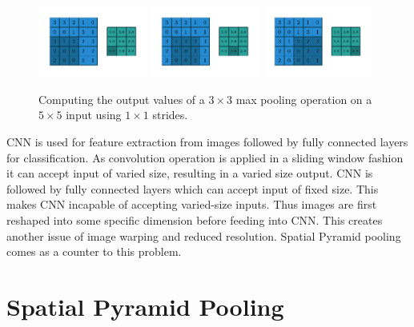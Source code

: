 \begin{figure}
    \includegraphics[width=0.32\textwidth]{pdf/numerical_max_pooling_06.pdf}
    \includegraphics[width=0.32\textwidth]{pdf/numerical_max_pooling_07.pdf}
    \includegraphics[width=0.32\textwidth]{pdf/numerical_max_pooling_08.pdf}
    \caption{\label{fig:numerical_max_pooling} Computing the output values of a
        $3 \times 3$ max pooling operation on a $5 \times 5$ input using $1
        \times 1$ strides.}
\end{figure}

CNN is used for feature extraction from images followed by fully connected layers for classification. As convolution operation is applied in a sliding window fashion it can accept input of varied size, resulting in a varied size output. CNN is followed by fully connected layers which can accept input of fixed size. This makes CNN incapable of accepting varied-size inputs. Thus images are first reshaped into some specific dimension before feeding into CNN. This creates another issue of image warping and reduced resolution. Spatial Pyramid pooling comes as a counter to this problem.

\section{Spatial Pyramid Pooling}

